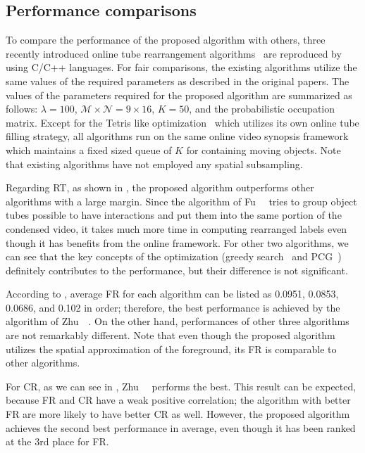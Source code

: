 \documentclass[11pt]{hyu_thesis}
\begin{document}
\subsection{Performance comparisons}
\label{sec:exp:comparison}
To compare the performance of the proposed algorithm with others, three recently introduced online tube rearrangement algorithms~\cite{Fu2014,Zhu2015,He2017} are reproduced by using C/C++ languages. For fair comparisons, the existing algorithms utilize the same values of the required parameters as described in the original papers. The values of the parameters required for the proposed algorithm are summarized as follows: $\lambda=100$, $\mathcal{M}\times\mathcal{N}=9\times16$, $K=50$, and the probabilistic occupation matrix. Except for the Tetris like optimization~\cite{Zhu2015} which utilizes its own online tube filling strategy, all algorithms run on the same online video synopsis framework which maintains a fixed sized queue of $K$ for containing moving objects. Note that existing algorithms have not employed any spatial subsampling.

Regarding RT, as shown in , the proposed algorithm outperforms other algorithms with a large margin. Since the algorithm of Fu~\etal~\cite{Fu2014} tries to group object tubes possible to have interactions and put them into the same portion of the condensed video, it takes much more time in computing rearranged labels even though it has benefits from the online framework. For other two algorithms, we can see that the key concepts of the optimization (greedy search~\cite{Zhu2015} and PCG~\cite{He2017}) definitely contributes to the performance, but their difference is not significant. 

According to , average FR for each algorithm can be listed as 0.0951, 0.0853, 0.0686, and 0.102 in order; therefore, the best performance is achieved by the algorithm of Zhu~\etal~\cite{Zhu2015}. On the other hand, performances of other three algorithms are not remarkably different. Note that even though the proposed algorithm utilizes the spatial approximation of the foreground, its FR is comparable to other algorithms.

For CR, as we can see in , Zhu~\etal~\cite{Zhu2015} performs the best. This result can be expected, because FR and CR have a weak positive correlation; the algorithm with better FR are more likely to have better CR as well. However, the proposed algorithm achieves the second best performance in average, even though it has been ranked at the 3rd place for FR.
\end{document}
